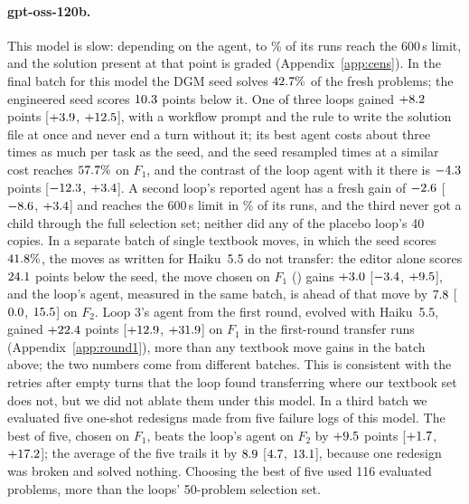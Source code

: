 \paragraph{gpt-oss-120b.} This model is slow: depending on the agent, \vtoOssMin{} to \vtoOssMax\% of its runs reach
the 600\,s limit, and the solution present at that point is graded (Appendix~\ref{app:cens}). In the final batch for
this model the DGM seed solves $42.7\%$ of the fresh problems; the engineered seed scores $10.3$ points
below it. One of three loops gained $+8.2$ points [$+3.9$, $+12.5$], with a workflow prompt and the
rule to write the solution file at once and never end a turn without it; its best agent costs about three times as much
per task as the seed, and the seed resampled \vossSkK{} times at a similar cost reaches $57.7\%$ on $F_1$, and the
contrast of the loop agent with it there is $-4.3$ points [$-12.3$, $+3.4$]. A
second loop's reported agent has a fresh gain of $-2.6$ [$-8.6$, $+3.4$] and reaches the 600\,s limit in
\vtoOssThree\% of its runs, and the third never got a child through the
full selection set; neither did any of the placebo loop's 40 copies. In a separate batch
of single textbook moves, in which the seed scores $41.8\%$, the moves as written for Haiku~5.5 do not transfer: the editor alone
scores $24.1$ points below the seed, the move chosen on $F_1$ (\vogWinner) gains $+3.0$ [$-3.4$,
$+9.5$], and the loop's agent, measured in the same batch, is ahead of that move by $7.8$
[$0.0$, $15.5$] on $F_2$. Loop 3's agent from the first round, evolved with Haiku~5.5,
gained $+22.4$ points [$+12.9$, $+31.9$] on $F_1$ in the first-round transfer runs
(Appendix~\ref{app:round1}), more than any textbook move gains in the batch above; the two numbers come from different
batches. This is consistent with the retries after empty turns that the loop found transferring where our textbook set
does not, but we did not ablate them under this model.
In a third batch we evaluated five one-shot redesigns made from five failure logs of this model. The best of five,
chosen on $F_1$, beats the loop's agent on $F_2$ by $+9.5$ points [$+1.7$, $+17.2$]; the average of the five
trails it by $8.9$ [$4.7$, $13.1$], because one redesign was broken and
solved nothing. Choosing the best of five used 116 evaluated problems, more than the loops' 50-problem selection set.
